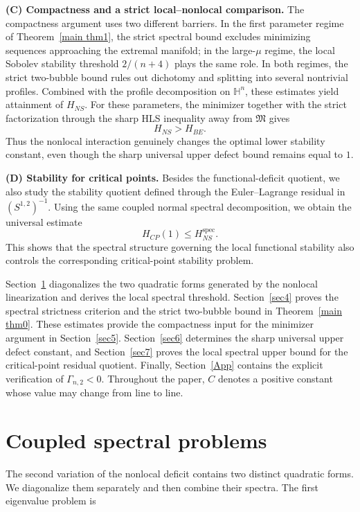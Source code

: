 \documentclass[10pt,a4paper]{amsart}
\begin{document}
{\bf (C) Compactness and a strict local--nonlocal comparison.}
{The compactness argument uses two different barriers. In the first parameter regime of Theorem~\ref{main thm1}, the strict spectral bound excludes minimizing sequences approaching the extremal manifold; in the large-$\mu$ regime, the local Sobolev stability threshold $2/(n+4)$ plays the same role. In both regimes, the strict two-bubble bound rules out dichotomy and splitting into several nontrivial profiles. Combined with the profile decomposition on $\mathbb H^n$, these estimates yield attainment of $H_{NS}$. For these parameters, the minimizer together with the strict factorization through the sharp HLS inequality away from $\mathfrak M$ gives}
\[
H_{NS}>H_{BE}.
\]
Thus the nonlocal interaction genuinely changes the optimal lower stability constant, even though the sharp universal upper defect bound remains equal to $1$.

\vspace{.1cm}

{\bf (D) Stability for critical points.}
Besides the functional-deficit quotient, we also study the stability quotient defined through the Euler--Lagrange residual in $(S^{1,2})^{-1}$. Using the same coupled normal spectral decomposition, we obtain the universal estimate
\[
H_{CP}(1)\le H_{NS}^{\mathrm{spec}}.
\]
This shows that the spectral structure governing the local functional stability also controls the corresponding critical-point stability problem.


\vspace{.2cm}

\begingroup
Section~\ref{sec3} diagonalizes the two quadratic forms generated by the nonlocal linearization and derives the local spectral threshold. Section~\ref{sec4} proves the spectral strictness criterion and the strict two-bubble bound in Theorem~\ref{main thm0}. These estimates provide the compactness input for the minimizer argument in Section~\ref{sec5}. Section~\ref{sec6} determines the sharp universal upper defect constant, and Section~\ref{sec7} proves the local spectral upper bound for the critical-point residual quotient. Finally, Section~\ref{App} contains the explicit verification of $\Gamma_{n,2}<0$. Throughout the paper, $C$ denotes a positive constant whose value may change from line to line.
\endgroup



\section{Coupled spectral problems}\label{sec3}
{The second variation of the nonlocal deficit contains two distinct quadratic forms. We diagonalize them separately and then combine their spectra. The first eigenvalue problem is}
\end{document}
